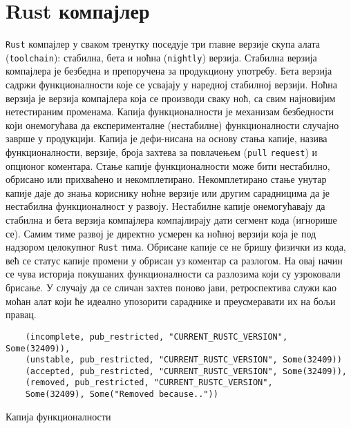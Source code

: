 \section{Rust компајлер}

\verb|Rust| компајлер у сваком тренутку поседује три главне верзије скупа алата (\verb|toolchain|): стабилна, бета и ноћна (\verb|nightly|) верзија.
Стабилна верзија компајлера је безбедна и препоручена за продукциону употребу. Бета верзија садржи функционалности
које се усвајају у наредној стабилној верзији. Ноћна верзија је верзија компајлера која се 
производи сваку ноћ, са свим најновијим нетестираним променама. Капија функционалности је механизам безбедности
који онемогућава да експерименталне (нестабилне) функционалности случајно заврше у продукцији. 
Капија је дефи\hyp{}нисана на основу стања капије, назива функционалности, верзије, броја захтева за повлачењем
(\verb|pull| \verb|request|) и опционог коментара.
Стање капије функционалности може бити нестабилно, обрисано или прихваћено и некомплетирано. Некомплетирано 
стање унутар капије даје до знања кориснику ноћне верзије или другим сарадницима да је нестабилна функционалност 
у развоју.  Нестабилне капије онемогућавају да стабилна и бета верзија компајлера компајлирају 
дати сегмент кода (игнорише се).  Самим тиме развој је директно 
усмерен ка ноћној верзији која је под надзором целокупног \verb|Rust| тима. Обрисане капије се не бришу физички из кода,
већ се статус капије промени у обрисан уз коментар са разлогом. На овај начин се чува историја покушаних 
функционалности са разлозима који су узроковали брисање. У случају да се сличан захтев поново јави, ретроспектива
служи као моћан алат који ће идеално упозорити сараднике и преусмеравати их на бољи правац.

\begin{listing}[H]
\begin{verbatim}
    (incomplete, pub_restricted, "CURRENT_RUSTC_VERSION", Some(32409)),
    (unstable, pub_restricted, "CURRENT_RUSTC_VERSION", Some(32409))
    (accepted, pub_restricted, "CURRENT_RUSTC_VERSION", Some(32409)),
    (removed, pub_restricted, "CURRENT_RUSTC_VERSION", 
    Some(32409), Some("Removed because.."))
\end{verbatim}
\caption{Капија функционалности}
\label{lst:rustup_set}
\end{listing}

